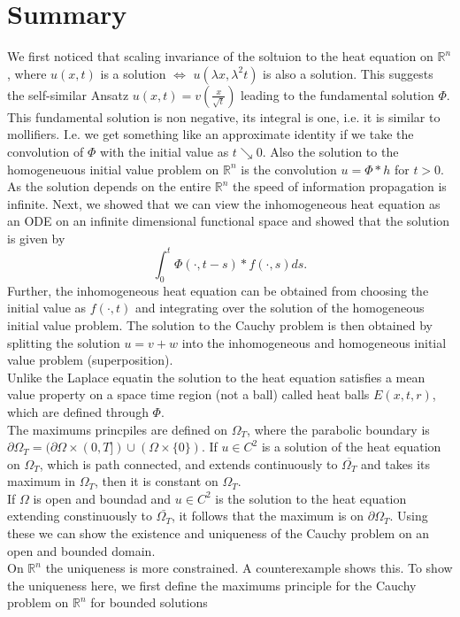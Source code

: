 \documentclass[A4,12pt,twoside]{book}
\begin{document}
\section{Summary}
We first noticed that scaling invariance of the soltuion to the heat equation on $\mathbb{R}^n$, where $u(x,t) $ is a solution $\iff$ $u(\lambda x,\lambda^2 t)$ is also a solution. This suggests the self-similar Ansatz $u(x,t) = v(\frac{x}{\sqrt{t}})$ leading to the fundamental solution $\Phi$. This fundamental solution is non negative, its integral is one, i.e. it is similar to mollifiers. I.e. we get something like an approximate identity if we take the convolution of $\Phi$ with the initial value as $t \searrow 0$. Also the solution to the homogeneuous initial value problem on $\mathbb{R}^n$ is the convolution $u=\Phi * h$ for $t>0$. As the solution depends on the entire $\mathbb{R}^n$ the speed of information propagation is infinite. Next, we showed that we can view the inhomogeneous heat equation as an ODE on an infinite dimensional functional space and showed that the solution is given by 
\[
\int_0^t \Phi (\cdot , t-s) * f(\cdot ,s ) ds.
\]
Further, the inhomogeneous heat equation can be obtained from choosing the initial value as $f(\cdot,t)$ and integrating over the solution of the homogeneous initial value problem. The solution to the Cauchy problem is then obtained by splitting the solution $u=v+w$ into the inhomogeneous and homogeneous initial value problem (superposition).\\
Unlike the Laplace equatin the solution to the heat equation satisfies a mean value property on a space time region (not a ball) called heat balls $E(x,t,r)$, which are defined through $\Phi$.\\
The maximums princpiles are defined on $\Omega_T$, where the parabolic boundary is $\partial \Omega_T = (\partial \Omega \times (0,T]) \cup (\Omega \times \{0\})$. If $u\in C^2$ is a solution of the heat equation on $\Omega_T$, which is path connected, and extends continuously to $\overline{\Omega_T}$ and takes its maximum in $\Omega_T$, then it is constant on $\Omega_T$. \\
If $\Omega$ is open and boundad and $u \in C^2$ is the solution to the heat equation extending constinuously to $\bar{\Omega_T}$, it follows that the maximum is on $\partial \Omega_T$. Using these we can show the existence and uniqueness of the Cauchy problem on an open and bounded domain.\\
On $\mathbb{R}^n$ the uniqueness is more constrained. A counterexample shows this. To show the uniqueness here, we first define the maximums principle for the Cauchy problem on $\mathbb{R}^n$ for bounded solutions 
\end{document}
